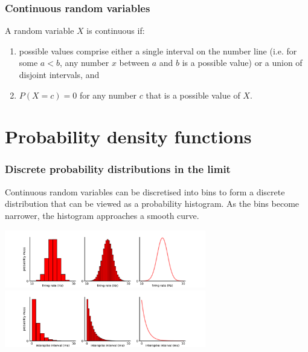 \documentclass[10pt]{beamer}
\begin{document}
\begin{frame}
\frametitle{Continuous random variables}

\begin{definition} 
A random variable $X$ is continuous if:
\begin{enumerate}
\item possible values comprise either a single interval on the number line (i.e. for some $a < b$, any number $x$ between $a$ and $b$ is a possible value) or a union of disjoint intervals, and
\item  $P(X = c) = 0$ for any number $c$ that is a possible value of $X$.
\end{enumerate}
\end{definition}

\end{frame}

\section{Probability density functions}
\begin{frame}
\frametitle{Discrete probability distributions in the limit} %


Continuous random variables can be discretised into bins to form a discrete distribution that can be viewed as a probability histogram. As the bins become narrower, the histogram approaches a smooth curve.

\center \includegraphics[height=2.5cm]{images/normal_mass_to_hist.png}
\vspace{-0.25cm}
\center \includegraphics[height=2.5cm]{images/exp_mass_to_hist.png}

\end{frame}
\end{document}
